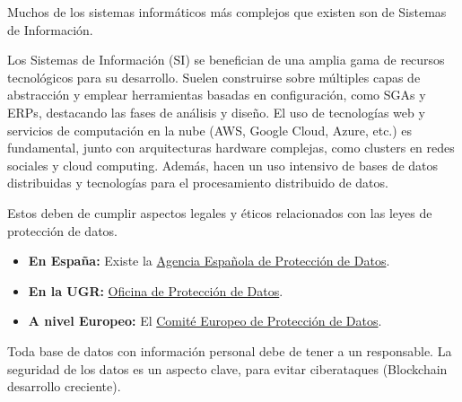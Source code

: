 \documentclass[12pt]{book} %
\providecommand{\tightlist}{%
  \setlength{\itemsep}{0pt}\setlength{\parskip}{0pt}}
\begin{document}
Muchos de los sistemas informáticos más complejos que existen son de
Sistemas de Información.

Los Sistemas de Información (SI) se benefician de una amplia gama de
recursos tecnológicos para su desarrollo. Suelen construirse sobre
múltiples capas de abstracción y emplear herramientas basadas en
configuración, como SGAs y ERPs, destacando las fases de análisis y
diseño. El uso de tecnologías web y servicios de computación en la nube
(AWS, Google Cloud, Azure, etc.) es fundamental, junto con arquitecturas
hardware complejas, como clusters en redes sociales y cloud computing.
Además, hacen un uso intensivo de bases de datos distribuidas y
tecnologías para el procesamiento distribuido de datos.

Estos deben de cumplir aspectos legales y éticos relacionados con las
leyes de protección de datos.

\begin{itemize}
\tightlist
\item
  \textbf{En España:} Existe la \href{https://www.aepd.es/es}{Agencia
  Española de Protección de Datos}.
\item
  \textbf{En la UGR:}
  \href{https://secretariageneral.ugr.es/unidades/oficina-proteccion-datos}{Oficina
  de Protección de Datos}.
\item
  \textbf{A nivel Europeo:} El
  \href{https://edpb.europa.eu/edpb_es}{Comité Europeo de Protección de
  Datos}.
\end{itemize}

Toda base de datos con información personal debe de tener a un
responsable. La seguridad de los datos es un aspecto clave, para evitar
ciberataques (Blockchain desarrollo creciente).

\end{document}
